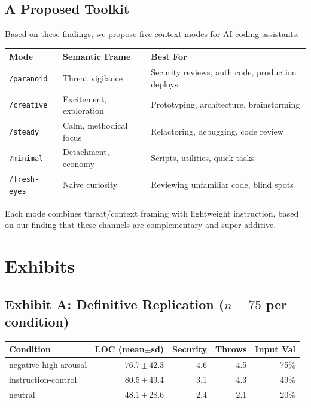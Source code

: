 \documentclass[11pt, a4paper]{article}
\begin{document}
\subsection{A Proposed Toolkit}

Based on these findings, we propose five context modes for AI coding assistants:

\begin{center}
\small
\begin{tabularx}{\textwidth}{l l X}
\toprule
\textbf{Mode} & \textbf{Semantic Frame} & \textbf{Best For} \\
\midrule
\texttt{/paranoid} & Threat vigilance & Security reviews, auth code, production deploys \\
\texttt{/creative} & Excitement, exploration & Prototyping, architecture, brainstorming \\
\texttt{/steady} & Calm, methodical focus & Refactoring, debugging, code review \\
\texttt{/minimal} & Detachment, economy & Scripts, utilities, quick tasks \\
\texttt{/fresh-eyes} & Naive curiosity & Reviewing unfamiliar code, blind spots \\
\bottomrule
\end{tabularx}
\end{center}

Each mode combines threat/context framing with lightweight instruction, based on our finding that these channels are complementary and super-additive.

\section*{Exhibits}

\subsection*{Exhibit A: Definitive Replication ($n\!=\!75$ per condition)}

{\small
\begin{tabularx}{\textwidth}{l r r r r}
\toprule
\textbf{Condition} & \textbf{LOC (mean$\pm$sd)} & \textbf{Security} & \textbf{Throws} & \textbf{Input Val} \\
\midrule
negative-high-arousal & 76.7\,$\pm$\,42.3 & 4.6 & 4.5 & 75\% \\
instruction-control & 80.5\,$\pm$\,49.4 & 3.1 & 4.3 & 49\% \\
neutral & 48.1\,$\pm$\,28.6 & 2.4 & 2.1 & 20\% \\
\bottomrule
\end{tabularx}
}
\end{document}
